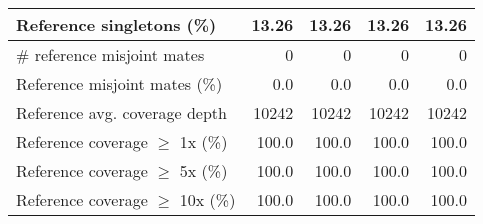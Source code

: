 \documentclass[12pt,a4paper]{article}
\begin{document}
\begin{table}[ht]
\begin{center}
\begin{tabular}{|l*{4}{|r}|}
Reference singletons (\%) & 13.26 & 13.26 & 13.26 & 13.26 \\ \hline
\# reference misjoint mates & 0 & 0 & 0 & 0 \\ \hline
Reference misjoint mates (\%) & 0.0 & 0.0 & 0.0 & 0.0 \\ \hline
Reference avg. coverage depth & 10242 & 10242 & 10242 & 10242 \\ \hline
Reference coverage $\geq$ 1x (\%) & 100.0 & 100.0 & 100.0 & 100.0 \\ \hline
Reference coverage $\geq$ 5x (\%) & 100.0 & 100.0 & 100.0 & 100.0 \\ \hline
Reference coverage $\geq$ 10x (\%) & 100.0 & 100.0 & 100.0 & 100.0 \\ \hline
\end{tabular}
\end{center}
\end{table}
\end{document}
